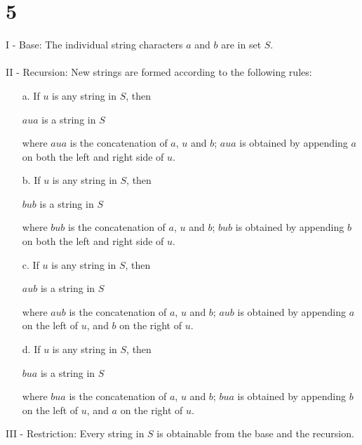 \documentclass[12pt]{article}
\begin{document}
\section*{5}
I - Base: The individual string characters $a$ and $b$ are in set $S$.
\\ \\
II - Recursion: New strings are formed according to the following rules:
\begin{itemize}
  \item [a.] If $u$ is any string in $S$, then
  \begin{center}
    $aua$ is a string in $S$\\
  \end{center}
  where $aua$ is the concatenation of $a$, $u$ and $b$; $aua$ is obtained by appending $a$ on both the left and right side of $u$.
  \item [b.] If $u$ is any string in $S$, then
  \begin{center}
    $bub$ is a string in $S$\\
  \end{center}
  where $bub$ is the concatenation of $a$, $u$ and $b$; $bub$ is obtained by appending $b$ on both the left and right side of $u$.
  \item [c.] If $u$ is any string in $S$, then
  \begin{center}
    $aub$ is a string in $S$\\
  \end{center}
  where $aub$ is the concatenation of $a$, $u$ and $b$; $aub$ is obtained by appending $a$ on the left of $u$, and $b$ on the right of $u$.
  \item [d.] If $u$ is any string in $S$, then
  \begin{center}
    $bua$ is a string in $S$\\
  \end{center}
  where $bua$ is the concatenation of $a$, $u$ and $b$; $bua$ is obtained by appending $b$ on the left of $u$, and $a$ on the right of $u$. 
\end{itemize}
III - Restriction: Every string in $S$ is obtainable from the base and the recursion.
\end{document}
